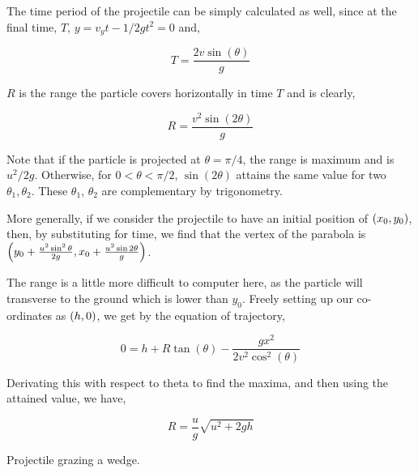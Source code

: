 The time period of the projectile can be simply calculated as well,
since at the final time, \(T\), \(y = v_yt - 1/2gt^2 = 0\) and,

\begin{equation}
    T = \frac{2v\sin(\theta)}{g}
\end{equation}

\(R\) is the range the particle covers horizontally in time \(T\) and is
clearly,

\begin{equation}
    R = \frac{v^2\sin(2\theta)}{g}
\end{equation}

Note that if the particle is projected at \(\theta = \pi/4\), 
the range is maximum and is \(u^2/2g\). Otherwise,
for \(0 < \theta < \pi/2\), \(\sin(2\theta)\) attains the same 
value for two \(\theta_1, \theta_2\). These \(\theta_1\), \(\theta_2\) are complementary
by trigonometry.

More generally, if we consider the projectile to have an initial position of 
\(\qty(x_0, y_0)\), then, by substituting for time, we find that the 
vertex of the parabola is \(\qty(y_0 + \frac{u^2\sin^2\theta}{2g}, x_0 + \frac{u^2\sin2\theta}{g})\).

The range is a little more difficult to computer here, as the particle will transverse to 
the ground which is lower than \(y_0\). Freely setting up our co-ordinates 
as \(\qty(h, 0)\), we get by the equation of trajectory,

\[
    0 = h + R\tan(\theta) - \frac{gx^2}{2v^2\cos^2(\theta)}
\]

Derivating this with respect to theta to find the maxima, and then using the attained
value, we have, 

\begin{equation}
    R = \frac{u}{g}\sqrt{u^2 + 2gh}
\end{equation}

\begin{marginfigure}
    \hspace{-2em}
    \caption{Projectile grazing a wedge.}
\end{marginfigure}

